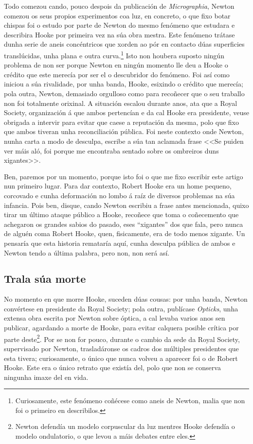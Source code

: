 \begin{refsection}
\begin{multicols}{2}
Todo comezou cando, pouco despois da publicación de \textit{Micrographia},
Newton comezou os seus propios experimentos coa luz, en concreto, o que fixo
botar chispas foi o estudo por parte de Newton do mesmo fenómeno que estudara e
describira Hooke por primeira vez na súa obra mestra. Este fenómeno trátase
dunha serie de aneis concéntricos que xorden ao pór en contacto dúas
superficies translúcidas, unha plana e outra curva.\footnote{Curiosamente, este
fenómeno coñécese como aneis de Newton, malia que non foi o primeiro en
describilos.} Isto non houbera suposto ningún problema de non ser porque Newton
en ningún momento lle deu a Hooke o crédito que este merecía por ser el o
descubridor do fenómeno. Foi así como iniciou a súa rivalidade, por unha banda,
Hooke, esixindo o crédito que merecía; pola outra, Newton, demasiado orgulloso
como para recoñecer que o seu traballo non foi totalmente orixinal. A situación
escalou durante anos, ata que a Royal Society, organización á que ambos
pertencían e da cal Hooke era presidente, veuse obrigada a intervir para evitar
que caese a reputación da mesma, polo que fixo que ambos tiveran unha
reconciliación pública. Foi neste contexto onde Newton, nunha carta a modo de
desculpa, escribe a súa tan aclamada frase <<Se puiden ver máis aló, foi porque
me encontraba sentado sobre os ombreiros duns xigantes>>.

Ben, paremos por un momento, porque isto foi o que me fixo escribir este artigo
nun primeiro lugar. Para dar contexto, Robert Hooke era un home pequeno,
corcovado e cunha deformación no lombo á raíz de diversos problemas na súa
infancia. Pois ben, disque, cando Newton escribiu a frase antes mencionada,
quixo tirar un último ataque público a Hooke, recoñece que toma o coñecemento
que achegaron os grandes sabios do pasado, eses ``xigantes'' dos que fala, pero
nunca de alguén coma Robert Hooke, quen, fisicamente, era de todo menos
xigante. Un pensaría que esta historia remataría aquí, cunha desculpa pública
de ambos e Newton tendo a última palabra, pero non, non será así.

\subsection*{Trala súa morte}

No momento en que morre Hooke, suceden dúas cousas: por unha banda, Newton
convértese en presidente da Royal Society; pola outra, publícase
\textit{Opticks}, unha extensa obra escrita por Newton sobre óptica, a cal
levaba varios anos sen publicar, agardando a morte de Hooke, para evitar
calquera posible crítica por parte deste\footnote{Newton defendía un modelo
corpuscular da luz mentres Hooke defendía o modelo ondulatorio, o que levou a
máis debates entre eles.}. Por se non for pouco, durante o cambio da sede da
Royal Society, supervisado por Newton, trasladáronse os cadros dos múltiples
presidentes que esta tivera; curiosamente, o único que nunca volveu a aparecer
foi o de Robert Hooke. Este era o único retrato que existía del, polo que non
se conserva ningunha imaxe del en vida.


\end{multicols}
\end{refsection}
